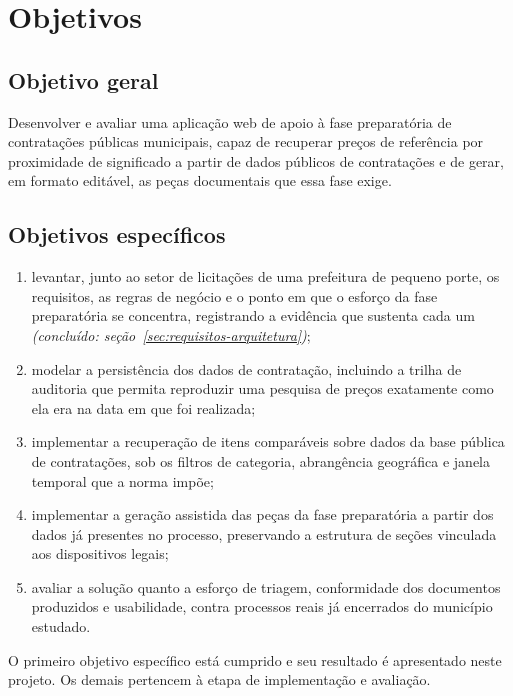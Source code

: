 \section{Objetivos}

\subsection{Objetivo geral}

Desenvolver e avaliar uma aplicação web de apoio à fase preparatória de
contratações públicas municipais, capaz de recuperar preços de referência por
proximidade de significado a partir de dados públicos de contratações e de gerar,
em formato editável, as peças documentais que essa fase exige.

\subsection{Objetivos específicos}

\begin{enumerate}
  \item levantar, junto ao setor de licitações de uma prefeitura de pequeno
    porte, os requisitos, as regras de negócio e o ponto em que o esforço da
    fase preparatória se concentra, registrando a evidência que sustenta cada
    um \emph{(concluído: seção~\ref{sec:requisitos-arquitetura})};
  \item modelar a persistência dos dados de contratação, incluindo a trilha de
    auditoria que permita reproduzir uma pesquisa de preços exatamente como ela
    era na data em que foi realizada;
  \item implementar a recuperação de itens comparáveis sobre dados da base
    pública de contratações, sob os filtros de categoria, abrangência
    geográfica e janela temporal que a norma impõe;
  \item implementar a geração assistida das peças da fase preparatória a partir
    dos dados já presentes no processo, preservando a estrutura de seções
    vinculada aos dispositivos legais;
  \item avaliar a solução quanto a esforço de triagem, conformidade dos
    documentos produzidos e usabilidade, contra processos reais já encerrados do
    município estudado.
\end{enumerate}

O primeiro objetivo específico está cumprido e seu resultado é apresentado neste
projeto. Os demais pertencem à etapa de implementação e avaliação.

